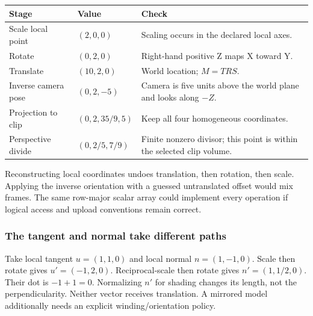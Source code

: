 {\def\LTcaptype{none} %
\begin{longtable}[]{@{}
  >{\raggedright\arraybackslash}p{}
  >{\raggedright\arraybackslash}p{}
  >{\raggedright\arraybackslash}p{}@{}}
\toprule\noalign{}
\begin{minipage}[b]{\linewidth}\raggedright
Stage
\end{minipage} & \begin{minipage}[b]{\linewidth}\raggedright
Value
\end{minipage} & \begin{minipage}[b]{\linewidth}\raggedright
Check
\end{minipage} \\
\midrule\noalign{}
\endhead
\bottomrule\noalign{}
\endlastfoot
Scale local point & \((2,0,0)\) & Scaling occurs in the declared local axes. \\
Rotate & \((0,2,0)\) & Right-hand positive Z maps X toward Y. \\
Translate & \((10,2,0)\) & World location; \(M=TRS\). \\
Inverse camera pose & \((0,2,-5)\) & Camera is five units above the world plane and looks along \(-Z\). \\
Projection to clip & \((0,2,35/9,5)\) & Keep all four homogeneous coordinates. \\
Perspective divide & \((0,2/5,7/9)\) & Finite nonzero divisor; this point is within the selected clip volume. \\
\end{longtable}
}

Reconstructing local coordinates undoes translation, then rotation, then scale. Applying the inverse orientation with a guessed untranslated offset would mix frames. The same row-major scalar array could implement every operation if logical access and upload conventions remain correct.

\subsubsection{The tangent and normal take different paths}\label{appendix-92ff77d4dfdc-the-tangent-and-normal-take-different-paths}

Take local tangent \(u=(1,1,0)\) and local normal \(n=(1,-1,0)\). Scale then rotate gives \(u'=(-1,2,0)\). Reciprocal-scale then rotate gives \(n'=(1,1/2,0)\). Their dot is \(-1+1=0\). Normalizing \(n'\) for shading changes its length, not the perpendicularity. Neither vector receives translation. A mirrored model additionally needs an explicit winding/orientation policy.

